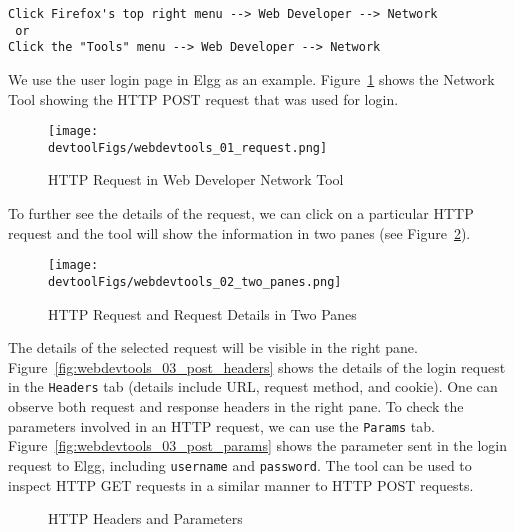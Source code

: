 \begin{lstlisting}
Click Firefox's top right menu --> Web Developer --> Network
 or 
Click the "Tools" menu --> Web Developer --> Network 
\end{lstlisting}


We use the user login page in Elgg as an example. 
Figure~\ref{fig:webdevtools_01_request} shows the Network Tool showing the HTTP POST request
that was used for login.

\begin{figure}[htb]
\begin{center}
\texttt{[image: \\devtoolFigs/webdevtools\_01\_request.png]}
\end{center}
\caption{HTTP Request in Web Developer Network Tool}
\label{fig:webdevtools_01_request}
\end{figure}

To further see the details of the request, we can click on a particular HTTP request and the
tool will show the information in two panes (see Figure~\ref{fig:webdevtools_02_two_panes}). 

\begin{figure}[htb]
\begin{center}
	\texttt{[image: \\devtoolFigs/webdevtools\_02\_two\_panes.png]}
\end{center}
\caption{HTTP Request and Request Details in Two Panes}
\label{fig:webdevtools_02_two_panes}
\end{figure}



The details of the selected request will be visible in the right pane.
Figure~\ref{fig:webdevtools_03_post_headers} shows the details of the login request in the
\texttt{Headers} tab (details include URL, request method, and cookie). One can observe both
request and response headers in the right pane. To check the parameters involved in an HTTP
request, we can use the \texttt{Params} tab. Figure~\ref{fig:webdevtools_03_post_params} shows
the parameter sent in the login request to Elgg, including \texttt{username} and
\texttt{password}. The tool can be used to inspect HTTP GET requests in a similar manner to HTTP POST requests.

\begin{figure}[htb]
 \centering
 \caption{HTTP Headers and Parameters}
\end{figure}


